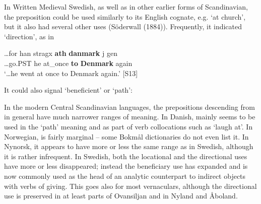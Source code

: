 
In Written Medieval Swedish, as well as in other earlier forms of Scandinavian, the preposition  could be used similarly to its English cognate, e.g.  ‘at church’, but it also had several other uses (Söderwall (1884)). Frequently, it indicated ‘direction’, as in


\ea\label{}
\gll …for  han  stragx  \textbf{ath} \textbf{danmark} j gen\\
…go.PST  he  at\_once  \textbf{to} \textbf{Denmark} again\\
\glt ‘…he went at once to Denmark again.’ [S13]
\z

It could also signal ‘beneficient’ or ‘path’:


\ea\label{}

\z 
\z

In the modern Central Scandinavian languages, the prepositions descending from  in general have much narrower ranges of meaning. In Danish, mainly seems to be used in the ‘path’ meaning and as part of verb collocations such as  ‘laugh at’. In Norwegian,  is fairly marginal – some Bokmål dictionaries do not even list it. In Nynorsk, it appears to have more or less the same range as in Swedish, although it is rather infrequent. In Swedish, both the locational and the directional uses have more or less disappeared; instead the beneficiary use has expanded and is now commonly used as the head of an analytic counterpart to indirect objects with verbs of giving. This goes also for most vernaculars, although the directional use is preserved in at least parts of Ovansiljan and in Nyland and Åboland. 

